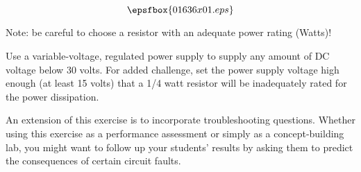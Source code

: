 

$$\epsfbox{01636x01.eps}$$

\vfil \eject






Note: be careful to choose a resistor with an adequate power rating (Watts)!







Use a variable-voltage, regulated power supply to supply any amount of DC voltage below 30 volts.  For added challenge, set the power supply voltage high enough (at least 15 volts) that a 1/4 watt resistor will be inadequately rated for the power dissipation.

An extension of this exercise is to incorporate troubleshooting questions.  Whether using this exercise as a performance assessment or simply as a concept-building lab, you might want to follow up your students' results by asking them to predict the consequences of certain circuit faults.




